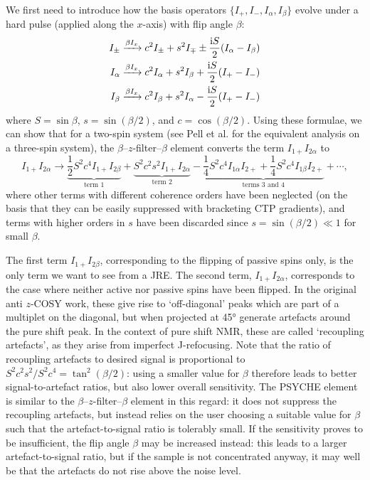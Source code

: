 We first need to introduce how the basis operators $\{I_+, I_-, I_\alpha, I_\beta\}$ evolve under a hard pulse (applied along the $x$-axis) with flip angle $\beta$:
\begin{align}
    I_{\pm} &\xrightarrow{\beta I_x} c^2 I_{\pm} + s^2I_{\mp} \pm \frac{\mathrm{i} S}{2}(I_\alpha - I_\beta) \label{eq:ipm_beta_evolution} \\
    I_{\alpha} &\xrightarrow{\beta I_x} c^2 I_{\alpha} + s^2I_{\beta} + \frac{\mathrm{i} S}{2}(I_+ - I_-) \label{eq:ialpha_beta_evolution} \\
    I_{\beta} &\xrightarrow{\beta I_x} c^2 I_{\beta} + s^2I_{\alpha} - \frac{\mathrm{i} S}{2}(I_+ - I_-) \label{eq:ibeta_beta_evolution}
\end{align}
where $S = \sin\beta$, $s = \sin(\beta/2)$, and $c = \cos(\beta/2)$.
Using these formulae, we can show that for a two-spin system (see Pell et al.\autocite{Pell2007MRC} for the equivalent analysis on a three-spin system), the $\beta$--$z$-filter--$\beta$ element converts the term $I_{1+}I_{2\alpha}$ to
\begin{equation}
    \label{eq:anti_z_cosy_transitions}
    I_{1+}I_{2\alpha} \longrightarrow
    {\underbrace{\frac{1}{2}S^2c^4 I_{1+}I_{2\beta}}_\text{term 1}}
    + {\underbrace{S^2c^2s^2I_{1+}I_{2\alpha}}_{\text{term 2}}}
    - {\underbrace{\frac{1}{4}S^2c^4I_{1\alpha}I_{2+}
    + \frac{1}{4}S^2c^4I_{1\beta}I_{2+}}_{\text{terms 3 and 4}}}
    + \cdots,
\end{equation}
where other terms with different coherence orders have been neglected (on the basis that they can be easily suppressed with bracketing CTP gradients), and terms with higher orders in $s$ have been discarded since $s = \sin(\beta/2) \ll 1$ for small $\beta$.

The first term $I_{1+}I_{2\beta}$, corresponding to the flipping of passive spins only, is the only term we want to see from a JRE.
The second term, $I_{1+}I_{2\alpha}$, corresponds to the case where neither active nor passive spins have been flipped.
In the original anti $z$-COSY work, these give rise to `off-diagonal' peaks which are part of a multiplet on the diagonal, but when projected at \ang{45} generate artefacts around the pure shift peak.
In the context of pure shift NMR, these are called `recoupling artefacts', as they arise from imperfect J-refocusing.
Note that the ratio of recoupling artefacts to desired signal is proportional to $S^2c^2s^2/S^2c^4 = \tan^2(\beta/2)$: using a smaller value for $\beta$ therefore leads to better signal-to-artefact ratios, but also lower overall sensitivity.
The PSYCHE element is similar to the $\beta$--$z$-filter--$\beta$ element in this regard: it does not suppress the recoupling artefacts, but instead relies on the user choosing a suitable value for $\beta$ such that the artefact-to-signal ratio is tolerably small.
If the sensitivity proves to be insufficient, the flip angle $\beta$ may be increased instead: this leads to a larger artefact-to-signal ratio, but if the sample is not concentrated anyway, it may well be that the artefacts do not rise above the noise level.%

